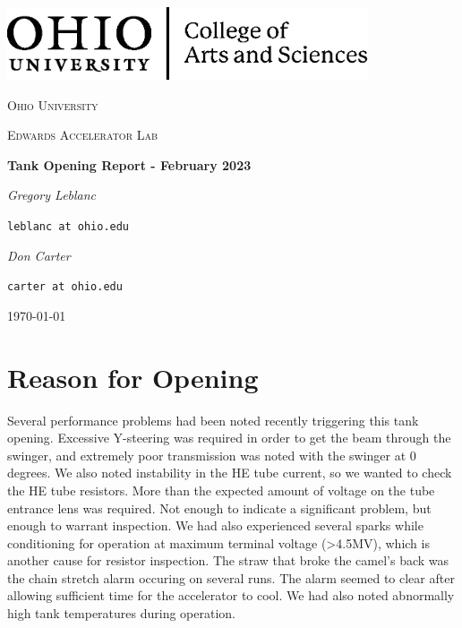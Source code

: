 \documentclass{scrartcl}
\begin{document}
\begin{titlepage}
	\centering
	\includegraphics[width=0.8\textwidth]{College_of_Arts_and_Sciences_H_Black.eps}\par\vspace{1cm} %
	{\scshape\LARGE Ohio University \par} 
	\vspace{1cm}
	{\scshape\Large Edwards Accelerator Lab\par} 
	\vspace{1.5cm}
	{\huge\bfseries Tank Opening Report - February 2023\par} 
	\vspace{2cm}
	{\Large\itshape Gregory Leblanc}\par
	\texttt{leblanc at ohio.edu}\par 
	\vspace{0.5cm}
	{\Large\itshape Don Carter}\par
	\texttt{carter at ohio.edu}\par 
	\vfill
	\vfill

	{\large \today\par}
\end{titlepage}


\section{Reason for Opening} %

Several performance problems had been noted recently triggering this tank opening.  Excessive Y-steering 
was required in order to get the beam through the swinger, and extremely poor transmission was noted with the 
swinger at 0 degrees.  We also noted instability in the HE tube current, so we wanted to check the HE tube 
resistors. More than the expected amount of voltage on the tube entrance lens was required.  Not enough to 
indicate a significant problem, but enough to warrant inspection.  We had also experienced several sparks
while conditioning for operation at maximum terminal voltage (>4.5MV), which is another cause for resistor
inspection.  The straw that broke the camel's back was the chain stretch alarm occuring on several runs.  
The alarm seemed to clear after allowing sufficient time for the accelerator to cool.  We had also 
noted abnormally high tank temperatures during operation.
\end{document}
